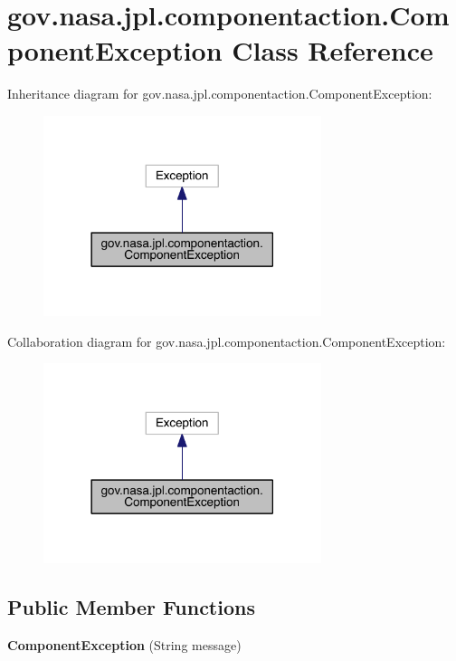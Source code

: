 \section{gov.\+nasa.\+jpl.\+componentaction.\+Component\+Exception Class Reference}
\label{classgov_1_1nasa_1_1jpl_1_1componentaction_1_1_component_exception}


Inheritance diagram for gov.\+nasa.\+jpl.\+componentaction.\+Component\+Exception\+:
\nopagebreak
\begin{figure}[H]
\begin{center}
\leavevmode
\includegraphics[width=230pt]{classgov_1_1nasa_1_1jpl_1_1componentaction_1_1_component_exception__inherit__graph}
\end{center}
\end{figure}


Collaboration diagram for gov.\+nasa.\+jpl.\+componentaction.\+Component\+Exception\+:
\nopagebreak
\begin{figure}[H]
\begin{center}
\leavevmode
\includegraphics[width=230pt]{classgov_1_1nasa_1_1jpl_1_1componentaction_1_1_component_exception__coll__graph}
\end{center}
\end{figure}
\subsection*{Public Member Functions}
\begin{DoxyCompactItemize}
\item 
{\bf Component\+Exception} (String message)
\end{DoxyCompactItemize}
